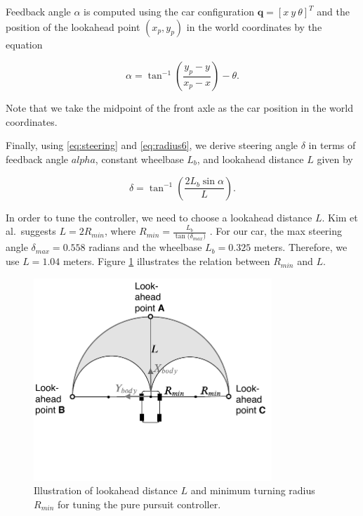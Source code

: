 Feedback angle $\alpha$ is computed using the car configuration $\textbf{q} =
[x\ y\ \theta]^T$ and the position of the lookahead point $(x_p, y_p)$ in the
world coordinates by the equation

\begin{equation}
  \alpha = \tan^{-1}(\frac{y_p - y}{x_p - x}) - \theta.
  \label{eq:alpha}
\end{equation}

Note that we take the midpoint of the front axle as the car position in the
world coordinates.

Finally, using \eqref{eq:steering} and \eqref{eq:radius6},
we derive steering angle $\delta$ in terms of feedback angle $alpha$,
constant wheelbase $L_b$, and lookahead distance $L$ given by

\begin{equation}
  \delta = \tan^{-1}(\frac{2L_b\sin\alpha}{L}).
  \label{eq:delta}
\end{equation}

In order to tune the controller, we need to choose a lookahead distance $L$.
Kim et al.\ suggests $L = 2R_{min}$, where $R_{min} =
\frac{L_b}{\tan({\delta_{max})}}$ \cite{Kim2013SensorbasedMP}. For our car, the
max steering angle $\delta_{max} = 0.558$ radians and the wheelbase $L_b =
0.325$ meters.  Therefore, we use $L = 1.04$ meters. Figure
\ref{figure:lookahead} illustrates the relation between $R_{min}$ and $L$.

\begin{figure}[h]
  \centering
  \includegraphics[width=0.8\textwidth]{figures/pure-pursuit-lookahead.pdf}
  \caption[Pure pursuit controller tuning]{Illustration of lookahead distance
  $L$ and minimum turning radius $R_{min}$ for tuning the pure pursuit
  controller.}
  \label{figure:lookahead}
\end{figure}

